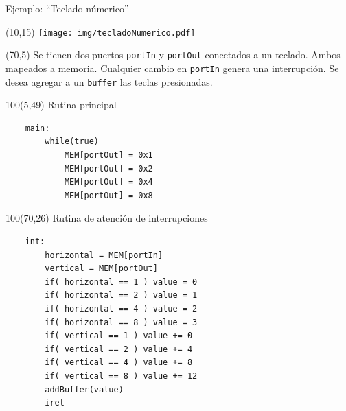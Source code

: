 \documentclass[aspectratio=169]{beamer}
\begin{document}
\begin{frame}[fragile,t]{Ejemplo: ``Teclado númerico''}
    \begin{textblock}{60}(10,15)
    \texttt{[image: img/tecladoNumerico.pdf]}\\
    \end{textblock}
    \begin{textblock}{80}(70,5)
    \small Se tienen dos puertos \texttt{portIn} y \texttt{portOut}
    conectados a un teclado. Ambos mapeados a memoria. Cualquier cambio en \texttt{portIn} genera una interrupción.
    Se desea agregar a un \texttt{buffer} las teclas presionadas.
    \end{textblock}
    \begin{textblock}{100}(5,49)
    \textcolor{naranjauca}{Rutina principal}
    \small
    \vspace{-0.2cm}
    \begin{verbatim}
    main:
        while(true)
            MEM[portOut] = 0x1
            MEM[portOut] = 0x2
            MEM[portOut] = 0x4
            MEM[portOut] = 0x8
    \end{verbatim}
    \end{textblock}        
    \begin{textblock}{100}(70,26)
    \textcolor{naranjauca}{Rutina de atención de interrupciones}
    \small
    \vspace{-0.2cm}
    \begin{verbatim}
    int:
        horizontal = MEM[portIn]
        vertical = MEM[portOut]
        if( horizontal == 1 ) value = 0
        if( horizontal == 2 ) value = 1
        if( horizontal == 4 ) value = 2
        if( horizontal == 8 ) value = 3
        if( vertical == 1 ) value += 0
        if( vertical == 2 ) value += 4
        if( vertical == 4 ) value += 8
        if( vertical == 8 ) value += 12
        addBuffer(value)
        iret
    \end{verbatim}
    \end{textblock}
\end{frame}
\end{document}
